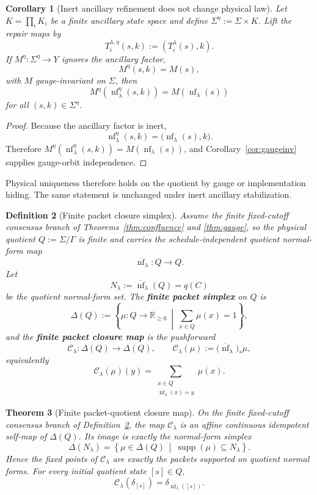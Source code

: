 \documentclass[11pt]{article}
\newtheorem{theorem}{Theorem}[section]
\newtheorem{corollary}[theorem]{Corollary}
\newtheorem{definition}[theorem]{Definition}
\theoremstyle{remark}
\theoremstyle{plain}
\begin{document}
\begin{corollary}[Inert ancillary refinement does not change physical law]\label{cor:ancilla}
Let \(K=\prod_i K_i\) be a finite ancillary state space and define \(\Sigma^\eta:=\Sigma\times K\). Lift the repair maps by
\[
T_i^{\lambda,\eta}(s,k):=(T_i^\lambda(s),k).
\]
If \(M^\eta:\Sigma^\eta\to Y\) ignores the ancillary factor,
\[
M^\eta(s,k)=M(s),
\]
with \(M\) gauge-invariant on \(\Sigma\), then
\[
M^\eta(\operatorname{nf}_\lambda^\eta(s,k))
=
M(\operatorname{nf}_\lambda(s))
\]
for all \((s,k)\in\Sigma^\eta\).
\end{corollary}

\begin{proof}
Because the ancillary factor is inert,
\[
\operatorname{nf}_\lambda^\eta(s,k)=\bigl(\operatorname{nf}_\lambda(s),k\bigr).
\]
Therefore \(M^\eta(\operatorname{nf}_\lambda^\eta(s,k))=M(\operatorname{nf}_\lambda(s))\), and Corollary~\ref{cor:gaugeinv} supplies gauge-orbit independence.
\end{proof}

Physical uniqueness therefore holds on the quotient by gauge or implementation hiding. The same
statement is unchanged under inert ancillary stabilization.

\begin{definition}[Finite packet closure simplex]\label{def:packet-closure-simplex}
Assume the finite fixed-cutoff consensus branch of Theorems~\ref{thm:confluence} and
\ref{thm:gauge}, so the physical quotient \(Q:=\Sigma/\Gamma\) is finite and carries the
schedule-independent quotient normal-form map
\[
\overline{\operatorname{nf}}_\lambda:Q\to Q.
\]
Let
\[
N_\lambda:=\overline{\operatorname{nf}}_\lambda(Q)=q(C)
\]
be the quotient normal-form set. The \textbf{finite packet simplex} on \(Q\) is
\[
\Delta(Q):=
\left\{
\mu:Q\to\mathbb R_{\ge0}\ \middle|\ \sum_{x\in Q}\mu(x)=1
\right\},
\]
and the \textbf{finite packet closure map} is the pushforward
\[
\mathcal C_\lambda:\Delta(Q)\to\Delta(Q),
\qquad
\mathcal C_\lambda(\mu):=
\bigl(\overline{\operatorname{nf}}_\lambda\bigr)_*\mu,
\]
equivalently
\[
\mathcal C_\lambda(\mu)(y)
=
\sum_{\substack{x\in Q\\ \overline{\operatorname{nf}}_\lambda(x)=y}}\mu(x).
\]
\end{definition}

\begin{theorem}[Finite packet-quotient closure map]\label{thm:finite-packet-closure}
On the finite fixed-cutoff consensus branch of Definition~\ref{def:packet-closure-simplex}, the
map \(\mathcal C_\lambda\) is an affine continuous idempotent self-map of \(\Delta(Q)\). Its
image is exactly the normal-form simplex
\[
\Delta(N_\lambda)
=
\left\{
\mu\in\Delta(Q)\ \middle|\ \operatorname{supp}(\mu)\subseteq N_\lambda
\right\}.
\]
Hence the fixed points of \(\mathcal C_\lambda\) are exactly the packets supported on quotient
normal forms. For every initial quotient state \([s]\in Q\),
\[
\mathcal C_\lambda(\delta_{[s]})
=
\delta_{\overline{\operatorname{nf}}_\lambda([s])}.
\]
\end{theorem}
\end{document}
